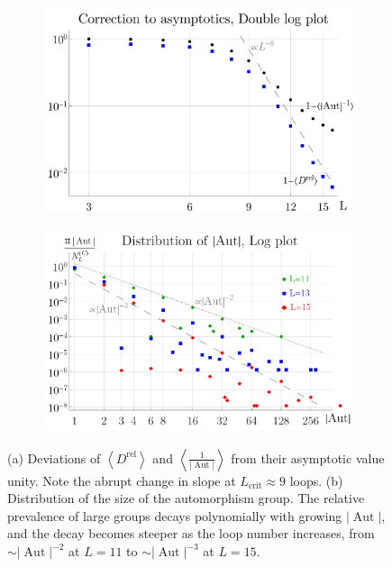 \documentclass[12pt,a4paper]{article}
\newcommand{\abs}[1]{\lvert #1 \rvert}
\newcommand{\Aut}{\operatorname{Aut}}
\renewcommand{\|}{\rule[-0.4ex]{0.2ex}{1.2em}}
\begin{document}
\begin{figure}[htb]
	\centering
	\begin{subfigure}[b]{.49 \textwidth}
		\includegraphics[width=\textwidth]{ratio_correction}
		\subcaption{}
		\label{fig:ratio_correction}
	\end{subfigure}
	\begin{subfigure}[b]{.49 \textwidth}
		\includegraphics[width=\textwidth]{aut_distribution}
		\subcaption{}
		\label{fig:aut_distribution}
	\end{subfigure}
	\caption{(a) Deviations of $ \left \langle D^\text{rel}\right \rangle $ and $\left \langle \frac{1}{\abs{\Aut}} \right \rangle  $ from their asymptotic value unity. Note the abrupt change in slope at $L_\text{crit} \approx 9$ loops. 
	(b) Distribution of the size of the automorphism group. The relative prevalence of large groups decays polynomially with growing $\abs{\Aut}$, and the decay becomes steeper as the loop number increases, from $\sim \abs{\Aut}^{-2}$ at $L=11$ to $\sim \abs{\Aut}^{-3}$ at $L=15$. }
\end{figure}
\end{document}
